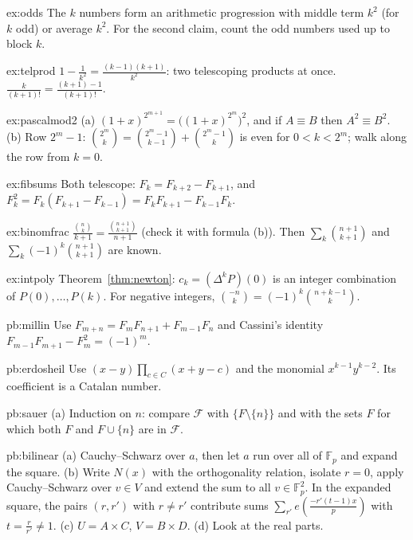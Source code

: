 \begin{hint}{ex:odds}
The $k$ numbers form an arithmetic progression with middle term $k^2$ (for $k$ odd) or average $k^2$. For the second claim, count the odd numbers used up to block $k$.
\end{hint}
\begin{hint}{ex:telprod}
$1-\frac1{k^2}=\frac{(k-1)(k+1)}{k^2}$: two telescoping products at once. $\frac k{(k+1)!}=\frac{(k+1)-1}{(k+1)!}$.
\end{hint}
\begin{hint}{ex:pascalmod2}
(a) $(1+x)^{2^{m+1}}=\bigl((1+x)^{2^m}\bigr)^2$, and if $A\equiv B$ then $A^2\equiv B^2$. (b) Row $2^m-1$: $\binom{2^m}k=\binom{2^m-1}{k-1}+\binom{2^m-1}k$ is even for $0<k<2^m$; walk along the row from $k=0$.
\end{hint}
\begin{hint}{ex:fibsums}
Both telescope: $F_k=F_{k+2}-F_{k+1}$, and $F_k^2=F_k(F_{k+1}-F_{k-1})=F_kF_{k+1}-F_{k-1}F_k$.
\end{hint}
\begin{hint}{ex:binomfrac}
$\frac{\binom nk}{k+1}=\frac{\binom{n+1}{k+1}}{n+1}$ (check it with formula (b)). Then $\sum_k\binom{n+1}{k+1}$ and $\sum_k(-1)^k\binom{n+1}{k+1}$ are known.
\end{hint}
\begin{hint}{ex:intpoly}
Theorem~\ref{thm:newton}: $c_k=(\Delta^kP)(0)$ is an integer combination of $P(0),\dots,P(k)$. For negative integers, $\binom{-n}k=(-1)^k\binom{n+k-1}k$.
\end{hint}


\begin{hint}{pb:millin}
Use $F_{m+n}=F_mF_{n+1}+F_{m-1}F_n$ and Cassini's identity $F_{m-1}F_{m+1}-F_m^2=(-1)^m$.
\end{hint}

\begin{hint}{pb:erdosheil}
Use $(x-y)\prod_{c\in C}(x+y-c)$ and the monomial $x^{k-1}y^{k-2}$. Its coefficient is a Catalan number.
\end{hint}

\begin{hint}{pb:sauer}
(a) Induction on $n$: compare $\mathcal F$ with $\{F\setminus\{n\}\}$ and with the sets $F$ for which both $F$ and $F\cup\{n\}$ are in $\mathcal F$.
\end{hint}

\begin{hint}{pb:bilinear}
(a) Cauchy--Schwarz over $a$, then let $a$ run over all of $\mathbb F_p$ and expand the square. (b) Write $N(x)$ with the orthogonality
relation, isolate $r=0$, apply Cauchy--Schwarz over $v\in V$ and extend the sum to all $v\in\mathbb F_p^2$. In the expanded square, the
pairs $(r,r')$ with $r\ne r'$ contribute sums $\sum_{r'}e(\frac{-r'(t-1)x}p)$ with $t=\frac r{r'}\ne1$. (c) $U=A\times C$, $V=B\times D$. (d) Look at the
real parts.
\end{hint}

